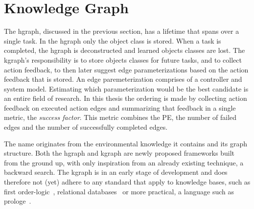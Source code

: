 \section{Knowledge Graph}%
\label{sec:kgraph}
The \ac{hgraph}, discussed in the previous section, has a lifetime that spans over a single task. In the \ac{hgraph} only the object class is stored. When a task is completed, the \ac{hgraph} is deconstructed and learned objects classes are lost. The \ac{kgraph}'s responsibility is to store objects classes for future tasks, and to collect action feedback, to then later suggest edge parameterizations based on the action feedback that is stored. An edge paremeterization comprises of a controller and system model. Estimating which parameterization would be the best candidate is an entire field of research. In this thesis the ordering is made by collecting action feedback on executed action edges and summarizing that feedback in a single metric, the \textit{success factor}. This metric combines the \acl{PE}, the number of failed edges and the number of successfully completed edges.\bs

The name  originates from the environmental knowledge it contains and its graph structure. Both the \ac{hgraph} and \ac{kgraph} are newly proposed frameworks built from the ground up, with only inspiration from an already existing technique, a backward search. The \ac{kgraph} is in an early stage of development and does therefore not (yet) adhere to any standard that apply to knowledge bases, such as first order-logic~\cite{barwise_introduction_1977,rensink_representing_2004}, relational databases~\cite{atzeni_relational_1993} or more practical, a language such as prologe~\cite{wielemaker_swiprolog_2012}.\bs






